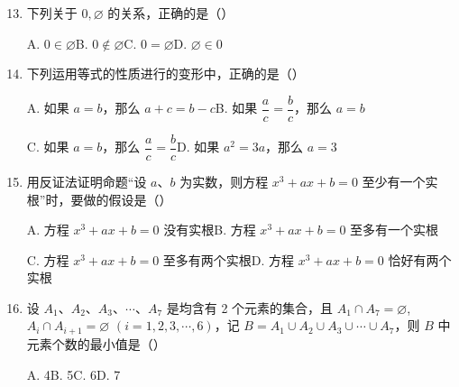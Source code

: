 \documentclass[a4paper,11pt]{article}
\begin{document}
\begin{enumerate}
\setcounter{enumi}{12}

\item 下列关于 $0,\varnothing$ 的关系，正确的是\mbox{（\quad）}

\keepwithprev
A. $0\in\varnothing$\qquad B. $0\notin\varnothing$\qquad C. $0=\varnothing$\qquad D. $\varnothing\in0$

\ifanswer
{}
\fi

\item 下列运用等式的性质进行的变形中，正确的是\mbox{（\quad）}

\keepwithprev
A. 如果 $a=b$，那么 $a+c=b-c$\qquad B. 如果 $\dfrac ac=\dfrac bc$，那么 $a=b$

C. 如果 $a=b$，那么 $\dfrac ac=\dfrac bc$\qquad D. 如果 $a^2=3a$，那么 $a=3$

\ifanswer
{}
\fi

\item 用反证法证明命题“设 $a$、$b$ 为实数，则方程 $x^3+ax+b=0$ 至少有一个实根”时，要做的假设是\mbox{（\quad）}

\keepwithprev
A. 方程 $x^3+ax+b=0$ 没有实根\qquad B. 方程 $x^3+ax+b=0$ 至多有一个实根

C. 方程 $x^3+ax+b=0$ 至多有两个实根\qquad D. 方程 $x^3+ax+b=0$ 恰好有两个实根

\ifanswer
{}
\fi

\item 设 $A_1$、$A_2$、$A_3$、$\cdots$、$A_7$ 是均含有 2 个元素的集合，且 $A_1\cap A_7=\varnothing$,$A_i\cap A_{i+1}=\varnothing$ $(i=1,2,3,\cdots,6)$，记 $B=A_1\cup A_2\cup A_3\cup\cdots\cup A_7$，则 $B$ 中元素个数的最小值是\mbox{（\quad）}

\keepwithprev
A. 4\qquad B. 5\qquad C. 6\qquad D. 7

\ifanswer
\solbegin
{}
\solend
\fi

\end{enumerate}

\end{document}

